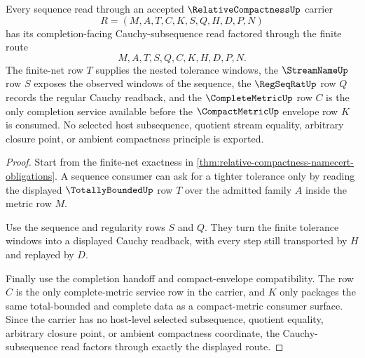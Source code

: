 \begin{theorem}
\label{thm:relative-compactness-cauchy-subsequence}
Every sequence read through an accepted $\RelativeCompactnessUp$ carrier
$$
R=(M,A,T,C,K,S,Q,H,D,P,N)
$$
has its completion-facing Cauchy-subsequence read factored through the finite route
$$
M,A,T,S,Q,C,K,H,D,P,N.
$$
The finite-net row $T$ supplies the nested tolerance windows, the $\StreamNameUp$ row $S$ exposes the observed windows of the sequence, the $\RegSeqRatUp$ row $Q$ records the regular Cauchy readback, and the $\CompleteMetricUp$ row $C$ is the only completion service available before the $\CompactMetricUp$ envelope row $K$ is consumed. No selected host subsequence, quotient stream equality, arbitrary closure point, or ambient compactness principle is exported.
\end{theorem}
\begin{proof}
Start from the finite-net exactness in \autoref{thm:relative-compactness-namecert-obligations}. A sequence consumer can ask for a tighter tolerance only by reading the displayed $\TotallyBoundedUp$ row $T$ over the admitted family $A$ inside the metric row $M$.

Use the sequence and regularity rows $S$ and $Q$. They turn the finite tolerance windows into a displayed Cauchy readback, with every step still transported by $H$ and replayed by $D$.

Finally use the completion handoff and compact-envelope compatibility. The row $C$ is the only complete-metric service row in the carrier, and $K$ only packages the same total-bounded and complete data as a compact-metric consumer surface. Since the carrier has no host-level selected subsequence, quotient equality, arbitrary closure point, or ambient compactness coordinate, the Cauchy-subsequence read factors through exactly the displayed route.
\end{proof}




